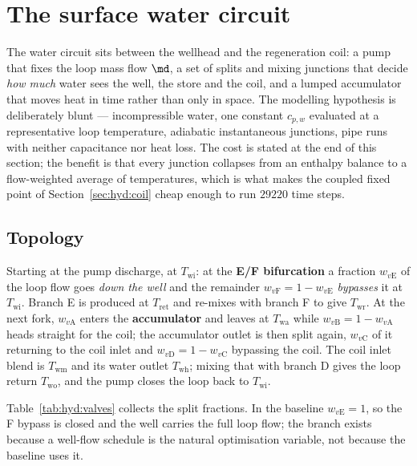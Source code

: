 \section{The surface water circuit}
\label{sec:hyd:circuit}

The water circuit sits between the wellhead and the regeneration coil: a pump that fixes the
loop mass flow $\md$, a set of splits and mixing junctions that decide \emph{how much} water
sees the well, the store and the coil, and a lumped accumulator that moves heat in time rather
than only in space. The modelling hypothesis is deliberately blunt --- incompressible water,
one constant $c_{p,w}$ evaluated at a representative loop temperature, adiabatic instantaneous
junctions, pipe runs with neither capacitance nor heat loss. The cost is stated at the end of
this section; the benefit is that every junction collapses from an enthalpy balance to a
flow-weighted average of temperatures, which is what makes the coupled fixed point of
Section~\ref{sec:hyd:coil} cheap enough to run $\num{29220}$ time steps.

\subsection{Topology}
\label{sec:hyd:topology}

Starting at the pump discharge, at $T_{\mathrm{wi}}$: at the \textbf{E/F bifurcation} a
fraction $w_{v\mathrm{E}}$ of the loop flow goes \emph{down the well} and the remainder
$w_{v\mathrm{F}}=1-w_{v\mathrm{E}}$ \emph{bypasses} it at $T_{\mathrm{wi}}$. Branch E is
produced at $T_{\mathrm{ret}}$ and re-mixes with branch F to give $T_{\mathrm{wr}}$. At the
next fork, $w_{v\mathrm{A}}$ enters the \textbf{accumulator} and leaves at $T_{\mathrm{wa}}$
while $w_{v\mathrm{B}}=1-w_{v\mathrm{A}}$ heads straight for the coil; the accumulator outlet
is then split again, $w_{v\mathrm{C}}$ of it returning to the coil inlet and
$w_{v\mathrm{D}}=1-w_{v\mathrm{C}}$ bypassing the coil. The coil inlet blend is
$T_{\mathrm{wm}}$ and its water outlet $T_{\mathrm{wh}}$; mixing that with branch D gives the
loop return $T_{\mathrm{wo}}$, and the pump closes the loop back to $T_{\mathrm{wi}}$.

Table~\ref{tab:hyd:valves} collects the split fractions. In the baseline $w_{v\mathrm{E}}=1$,
so the F bypass is closed and the well carries the full loop flow; the branch exists because a
well-flow schedule is the natural optimisation variable, not because the baseline uses it.

